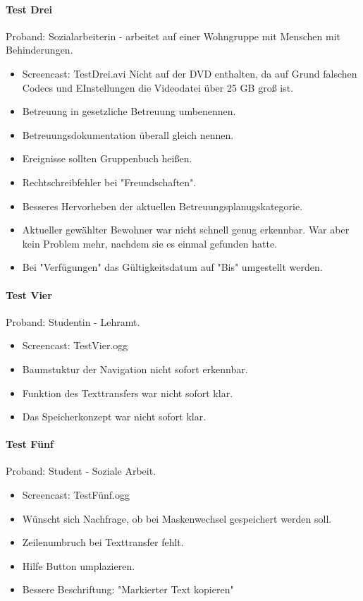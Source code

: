 \paragraph*{Test Drei}
Proband: Sozialarbeiterin - arbeitet auf einer Wohngruppe mit Menschen mit Behinderungen. 
\begin{itemize}
	\item Screencast: Test\textunderscore Drei.avi Nicht auf der DVD enthalten, da auf Grund falschen Codecs und EInstellungen die Videodatei über
25 GB groß ist.
	\item Betreuung in gesetzliche Betreuung umbenennen. 
	\item Betreuungsdokumentation überall gleich nennen.
	\item Ereignisse sollten Gruppenbuch heißen.
	\item Rechtschreibfehler bei "Freundschaften".
	\item Besseres Hervorheben der aktuellen Betreuungsplanugskategorie.
	\item Aktueller gewählter Bewohner war nicht schnell genug erkennbar. War aber kein Problem mehr, nachdem sie es einmal gefunden hatte.
	\item Bei "Verfügungen" das Gültigkeitsdatum auf "Bis" umgestellt werden.
\end{itemize}

\paragraph*{Test Vier}
Proband: Studentin - Lehramt.
\begin{itemize}
	\item Screencast: Test\textunderscore Vier.ogg
	\item Baumstuktur der Navigation nicht sofort erkennbar.
	\item Funktion des Texttransfers war nicht sofort klar.
	\item Das Speicherkonzept war nicht sofort klar.
\end{itemize}

\paragraph*{Test Fünf}
Proband: Student - Soziale Arbeit. 
\begin{itemize}
	\item Screencast: Test\textunderscore Fünf.ogg
	\item Wünscht sich Nachfrage, ob bei Maskenwechsel gespeichert werden soll. 
	\item Zeilenumbruch bei Texttransfer fehlt. 
	\item Hilfe Button umplazieren.
	\item Bessere Beschriftung: "Markierter Text kopieren"
\end{itemize}

